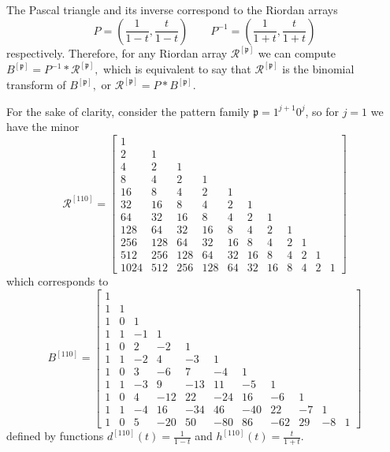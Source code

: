 The Pascal triangle and its inverse correspond to the Riordan arrays $$P
=\left(\frac{1}{1-t},\frac{t}{1-t}\right) \quad\quad
P^{-1}=\left(\frac{1}{1+t},\frac{t}{1+t}\right)$$ respectively.  Therefore, for
any Riordan array $\mathcal{R}^{[\mathfrak{p}]}$ we can compute
$B^{[\mathfrak{p}]}= P^{-1} \ast \mathcal{R}^{[\mathfrak{p}]},$ which is
equivalent to say that  $\mathcal{R}^{[\mathfrak{p}]}$ is the binomial
transform of $B^{[\mathfrak{p}]},$ or $\mathcal{R}^{[\mathfrak{p}]}=P \ast
B^{[\mathfrak{p}]}$.

For the sake of clarity, consider the pattern family $\mathfrak{p}=1^{j+1}0^{j}$,
so for $j=1$ we have the minor
\begin{displaymath}
\mathcal{R}^{[110]} = \left[\begin{array}{ccccccccccc}1 &  &  &  &  &  &  &  &  &  & \\2 & 1 &  &  &  &  &  &  &  &  & \\4 & 2 & 1 &  &  &  &  &  &  &  & \\8 & 4 & 2 & 1 &  &  &  &  &  &  & \\16 & 8 & 4 & 2 & 1 &  &  &  &  &  & \\32 & 16 & 8 & 4 & 2 & 1 &  &  &  &  & \\64 & 32 & 16 & 8 & 4 & 2 & 1 &  &  &  & \\128 & 64 & 32 & 16 & 8 & 4 & 2 & 1 &  &  & \\256 & 128 & 64 & 32 & 16 & 8 & 4 & 2 & 1 &  & \\512 & 256 & 128 & 64 & 32 & 16 & 8 & 4 & 2 & 1 & \\1024 & 512 & 256 & 128 & 64 & 32 & 16 & 8 & 4 & 2 & 1\end{array}\right]
\end{displaymath}
which corresponds to
\begin{displaymath}
B^{[110]} = \left[\begin{array}{ccccccccccc}
1 &  &  &  &  &  &  &  &  &  & \\
1 & 1 &  &  &  &  &  &  &  &  & \\
1 & 0 & 1 &  &  &  &  &  &  &  & \\
1 & 1 & -1 & 1 &  &  &  &  &  &  & \\
1 & 0 & 2 & -2 & 1 &  &  &  &  &  & \\
1 & 1 & -2 & 4 & -3 & 1 &  &  &  &  & \\
1 & 0 & 3 & -6 & 7 & -4 & 1 &  &  &  & \\
1 & 1 & -3 & 9 & -13 & 11 & -5 & 1 &  &  & \\
1 & 0 & 4 & -12 & 22 & -24 & 16 & -6 & 1 &  & \\
1 & 1 & -4 & 16 & -34 & 46 & -40 & 22 & -7 & 1 & \\
1 & 0 & 5 & -20 & 50 & -80 & 86 & -62 & 29 & -8 & 1\end{array}\right]
\end{displaymath}
defined by functions
$ d^{[110]}(t)=\frac{1}{1-t}$ and
$h^{[110]}(t)=\frac{t}{1+t}$.

